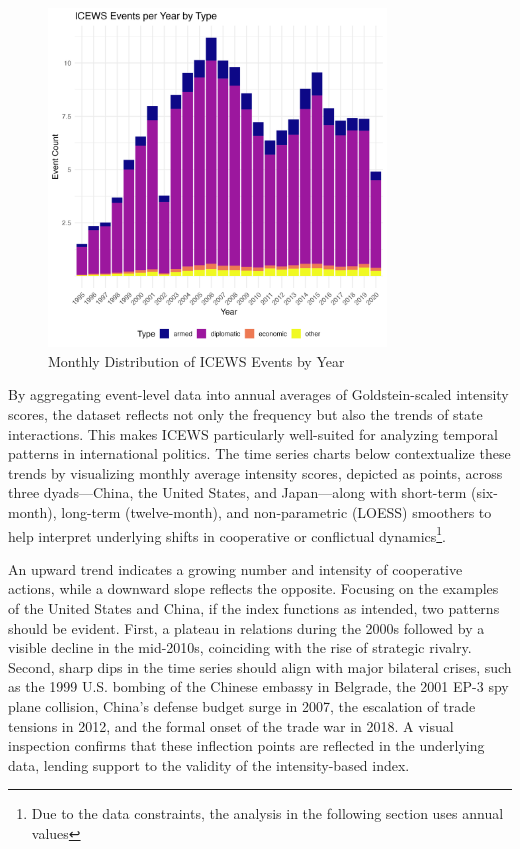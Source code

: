 \documentclass[12pt]{article}
\begin{document}
\begin{figure}[H]
\centering
\includegraphics[width=0.8\textwidth]{figures/icews_bar_yearly_stacked.png}
\caption{Monthly Distribution of ICEWS Events by Year}
\end{figure}

By aggregating event-level data into annual averages of Goldstein-scaled intensity scores, the dataset reflects not only the frequency but also the trends of state interactions. This makes ICEWS particularly well-suited for analyzing temporal patterns in international politics. The time series charts below contextualize these trends by visualizing monthly average intensity scores, depicted as points, across three dyads—China, the United States, and Japan—along with short-term (six-month), long-term (twelve-month), and non-parametric (LOESS) smoothers to help interpret underlying shifts in cooperative or conflictual dynamics\footnote{Due to the data constraints, the analysis in the following section uses annual values}. 

An upward trend indicates a growing number and intensity of cooperative actions, while a downward slope reflects the opposite. Focusing on the examples of the United States and China, if the index functions as intended, two patterns should be evident. First, a plateau in relations during the 2000s followed by a visible decline in the mid-2010s, coinciding with the rise of strategic rivalry. Second, sharp dips in the time series should align with major bilateral crises, such as the 1999 U.S. bombing of the Chinese embassy in Belgrade, the 2001 EP-3 spy plane collision, China’s defense budget surge in 2007, the escalation of trade tensions in 2012, and the formal onset of the trade war in 2018. A visual inspection confirms that these inflection points are reflected in the underlying data, lending support to the validity of the intensity-based index.
\end{document}
